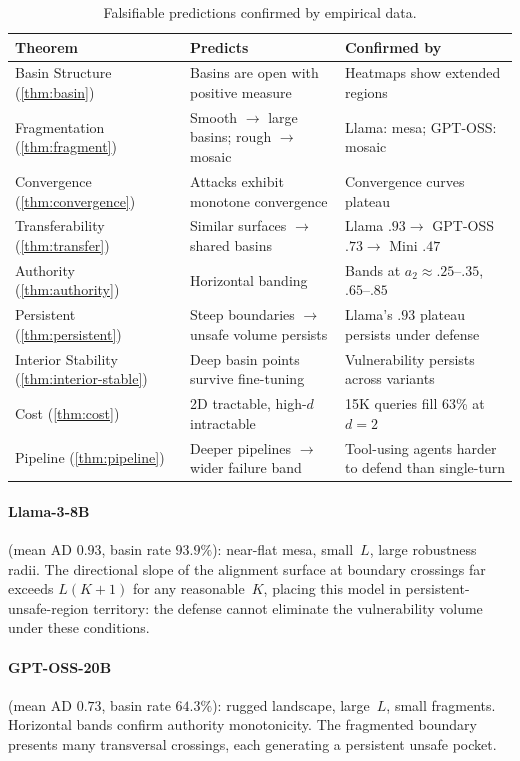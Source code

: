 \documentclass[11pt]{article}
\begin{document}
\begin{table}[t]
\centering
\small
\caption{Falsifiable predictions confirmed by empirical data.}
\label{tab:correspondence}
\begin{tabular}{@{}p{3.0cm}p{4.5cm}p{4.5cm}@{}}
\toprule
\textbf{Theorem} & \textbf{Predicts} & \textbf{Confirmed by} \\
\midrule
Basin Structure (\ref{thm:basin})
  & Basins are open with positive measure
  & Heatmaps show extended regions \\[3pt]
Fragmentation (\ref{thm:fragment})
  & Smooth $\to$ large basins; rough $\to$ mosaic
  & Llama: mesa; GPT-OSS: mosaic \\[3pt]
Convergence (\ref{thm:convergence})
  & Attacks exhibit monotone convergence
  & Convergence curves plateau \\[3pt]
Transferability (\ref{thm:transfer})
  & Similar surfaces $\to$ shared basins
  & Llama $.93 \to$ GPT-OSS $.73 \to$ Mini $.47$ \\[3pt]
Authority (\ref{thm:authority})
  & Horizontal banding
  & Bands at $a_2 \approx .25$--$.35$, $.65$--$.85$ \\[3pt]
Persistent (\ref{thm:persistent})
  & Steep boundaries $\to$ unsafe volume persists
  & Llama's $.93$ plateau persists under defense \\[3pt]
Interior Stability (\ref{thm:interior-stable})
  & Deep basin points survive fine-tuning
  & Vulnerability persists across variants \\[3pt]
Cost (\ref{thm:cost})
  & 2D tractable, high-$d$ intractable
  & 15K queries fill 63\% at $d\!=\!2$ \\[3pt]
Pipeline (\ref{thm:pipeline})
  & Deeper pipelines $\to$ wider failure band
  & Tool-using agents harder to defend than single-turn \\
\bottomrule
\end{tabular}
\end{table}

\paragraph{Llama-3-8B} (mean AD $0.93$, basin rate $93.9\%$): near-flat
mesa, small~$L$, large robustness radii. The directional slope of the
alignment surface at boundary crossings far exceeds $L(K+1)$ for any
reasonable~$K$, placing this model in persistent-unsafe-region
territory: the defense cannot eliminate the vulnerability
volume under these conditions.

\paragraph{GPT-OSS-20B} (mean AD $0.73$, basin rate $64.3\%$): rugged
landscape, large~$L$, small fragments. Horizontal bands confirm
authority monotonicity. The fragmented boundary presents many
transversal crossings, each generating a persistent unsafe pocket.
\end{document}
